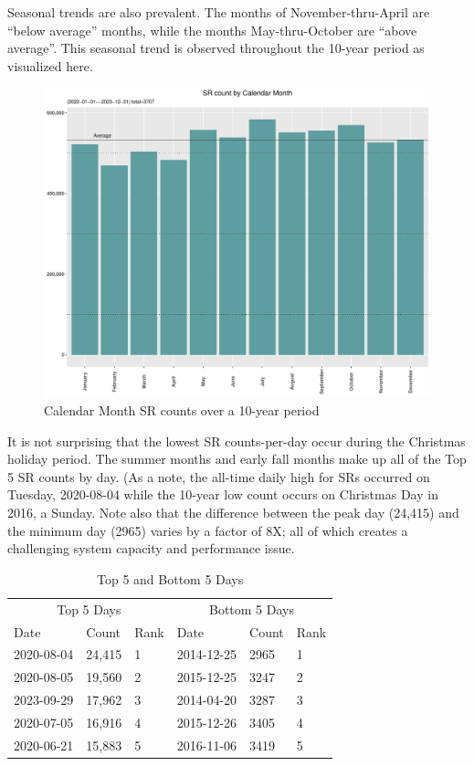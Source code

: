 \documentclass[12pt, titlepage]{article}
\begin{document}
Seasonal trends are also prevalent. The months of November-thru-April are ``below average'' months, while the months May-thru-October are ``above average''. 
This seasonal trend is observed throughout the 10-year period as visualized here.

\begin{figure}[H]
  \centering
  \includegraphics[width=\textwidth]{Calendar-Month.pdf}
  \caption{Calendar Month SR counts over a 10-year period}
  \label{fig:calendar-months-counts}
\end{figure}

It is not surprising that the lowest SR counts-per-day occur during the Christmas holiday period. The summer months and early
fall months make up all of the Top 5 SR counts by day. (As a note, the all-time daily high for SRs occurred on Tuesday, 2020-08-04 while the 10-year
low count occurs on Christmas Day in 2016, a Sunday. Note also that the difference between the peak day (24,415) and the minimum day (2965) varies
by a factor of 8X; all of which creates a challenging  system capacity and performance issue.

\begin{table}[H]
    \centering
    \small
    \begin{tabular}{@{}lll|lll@{}}
        \toprule
        \multicolumn{3}{c|}{Top 5 Days} & \multicolumn{3}{c}{Bottom 5 Days} \\
        \cmidrule(r){1-3} \cmidrule(l){4-6}
        Date & Count & Rank & Date & Count & Rank \\
        \midrule
        2020-08-04 & 24,415 & 1 & 2014-12-25 & 2965 & 1 \\
        2020-08-05 & 19,560 & 2 & 2015-12-25 & 3247 & 2 \\
        2023-09-29 & 17,962 & 3 & 2014-04-20 & 3287 & 3 \\
        2020-07-05 & 16,916 & 4 & 2015-12-26 & 3405 & 4 \\
        2020-06-21 & 15,883 & 5 & 2016-11-06 & 3419 & 5 \\
        \bottomrule
    \end{tabular}
    \caption{Top 5 and Bottom 5 Days}
    \label{tab:combined_counts}
\end{table}
\end{document}
